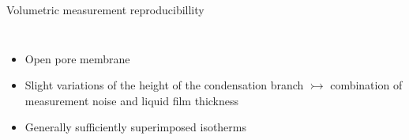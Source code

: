 \documentclass[../defence.tex]{subfiles}
\begin{document}
\begin{frame}{Volumetric measurement reproducibillity}
\begin{columns}[onlytextwidth, T]
{}
        \begin{itemize}
            \item Open pore membrane
            \pause
            \item Slight variations of the height of the condensation branch \pause $\rightarrowtail$ combination of measurement noise and liquid film thickness
            \pause
            \item Generally sufficiently superimposed isotherms
        \end{itemize}
    \end{columns}
  \end{frame}
\end{document}
